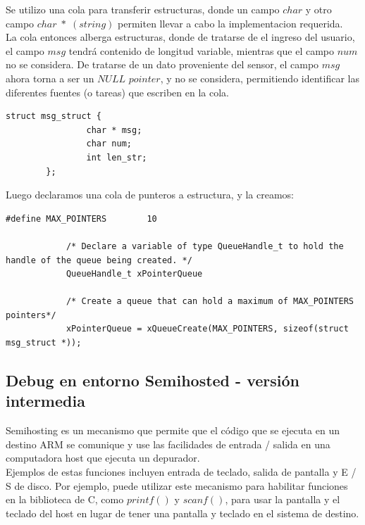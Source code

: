 \documentclass{article}
\begin{document}
Se utilizo una cola para transferir estructuras, donde un campo $char$ y otro campo $char \; * \; (string)$  permiten llevar a cabo la implementacion requerida. \\

La cola entonces alberga estructuras, donde de tratarse de el ingreso del usuario, el campo $msg$ tendrá contenido de longitud variable, mientras que el campo $num$ no se considera. De tratarse de un dato proveniente del sensor, el campo $msg$ ahora torna a ser un $NULL$ $pointer$, y no se considera, permitiendo identificar las diferentes fuentes (o
tareas) que escriben en la cola. \\

\begin{lstlisting}[style=CStyle]
		struct msg_struct {
				char * msg;
				char num;
				int len_str;
		};
\end{lstlisting}


Luego declaramos una cola de punteros a estructura, y la creamos:\\

\begin{lstlisting}[style=CStyle]
			#define MAX_POINTERS		10
			
			/* Declare a variable of type QueueHandle_t to hold the handle of the queue being created. */
			QueueHandle_t xPointerQueue
			
			/* Create a queue that can hold a maximum of MAX_POINTERS pointers*/
			xPointerQueue = xQueueCreate(MAX_POINTERS, sizeof(struct msg_struct *)); 
\end{lstlisting}

\subsection{Debug en entorno Semihosted - versión intermedia}
Semihosting es un mecanismo que permite que el código que se ejecuta en un destino ARM se comunique y use las facilidades de entrada / salida en una computadora host que ejecuta un depurador.\\

Ejemplos de estas funciones incluyen entrada de teclado, salida de pantalla y E / S de disco. Por ejemplo, puede utilizar este mecanismo para habilitar funciones en la biblioteca de C, como $printf()$ y $scanf()$, para usar la pantalla y el teclado del host en lugar de tener una pantalla y teclado en el sistema de destino.\\
\end{document}
